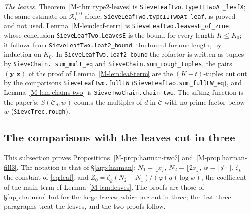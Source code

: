 \documentclass[11pt]{article}
\newcommand{\lean}[1]{\texttt{#1}}
\numberwithin{equation}{section}
\begin{document}
\emph{The leaves.} Theorem~\ref{M-thm:type2-leaves} is \lean{SieveLeafTwo.\allowbreak typeIITwoAt\_leafX}; the same
estimate on $\mathcal R^{\mathrm{lf},0}_L$ alone, \lean{SieveLeafTwo.\allowbreak typeIITwoAt\_leaf}, is proved and not
used. Lemma~\ref{M-lem:leaf-term} is \lean{SieveLeafTwo.\allowbreak leavesE\_of\_zone}, whose conclusion
\lean{SieveLeafTwo.\allowbreak LeavesE} is the bound for every length $K \le K_0$; it follows from
\lean{SieveLeafTwo.\allowbreak leaf2\_bound}, the bound for one length, by induction on $K_0$. In
\lean{SieveLeafTwo.\allowbreak leaf2\_bound} the cofactor is written as tuples by \lean{SieveChain.\allowbreak
sum\_mult\_eq} and \lean{SieveChain.\allowbreak sum\_rough\_tuples}, the pairs $(\mathbf y, \mathbf z)$ of the proof of
Lemma~\ref{M-lem:leaf-term} are the $(K + t)$-tuples cut out by the comparisons \lean{SieveLeafTwo.\allowbreak fullLW}
(\lean{SieveLeafTwo.\allowbreak sum\_fullLW\_eq}), and
Lemma~\ref{M-lem:chains-two} is \lean{SieveTwoChain.\allowbreak chain\_two}. The sifting function is the paper's:
$S(\mathcal C_d, w)$ counts the multiples of $d$ in $\mathcal C$ with no prime factor below $w$
(\lean{SieveTree.\allowbreak rough}).

\subsection*{The comparisons with the leaves cut in three}

This subsection proves Propositions~\ref{M-prop:harman-two3} and~\ref{M-prop:harman-fill3}. The notation is that of
\S\ref{app:harman}: $N_1 = \lfloor x \rfloor$, $N_2 = \lfloor 2x \rfloor$, $w = \lceil q^{\varepsilon_w} \rceil$,
$\zeta_k$ the constant of \eqref{eq:leaf}, and $Z_0 = \zeta_k (N_2 - N_1)/(\varphi(q) \log w)$, the coefficient of the
main
term of Lemma~\ref{M-lem:leaves}. The proofs are those of \S\ref{app:harman} but for the large leaves, which are cut in
three; the first three paragraphs treat the leaves, and the two proofs follow.
\end{document}
